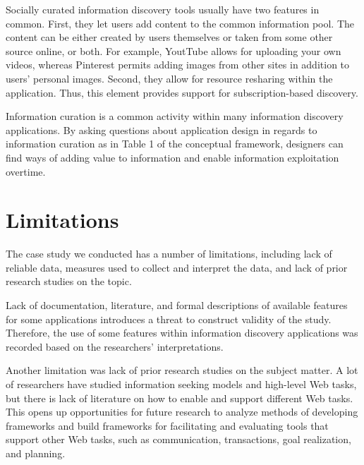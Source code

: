 \documentclass{casconpaper}
\begin{document}
{Socially curated information discovery tools usually have two features in common. First, they let users add content to the common information pool. The content can be either created by users themselves or taken from some other source online, or both. For example, YoutTube allows for uploading your own videos, whereas Pinterest permits adding images from other sites in addition to users' personal images. Second, they allow for resource resharing within the application. Thus, this element provides support for subscription-based discovery.

Information curation is a common activity within many information discovery applications. By asking questions about application design in regards to information curation as in Table 1 of the conceptual framework, designers can find ways of adding value to information and enable information exploitation overtime.  
 
} %

{\section{Limitations}
The case study we conducted has a number of limitations, including lack of reliable data, measures used to collect and interpret the data, and lack of prior research studies on the topic. 

Lack of documentation, literature, and formal descriptions of available features for some applications introduces a threat to construct validity of the study. Therefore, the use of some features within information discovery applications was recorded based on the researchers' interpretations. 

Another limitation was lack of prior research studies on the subject matter. A lot of researchers have studied information seeking models and high-level Web tasks, but there is lack of literature on how to enable and support different Web tasks. This opens up opportunities for future research to analyze methods of developing frameworks and build frameworks for facilitating and evaluating tools that support other Web tasks, such as communication, transactions, goal realization, and planning.

} %
\end{document}
